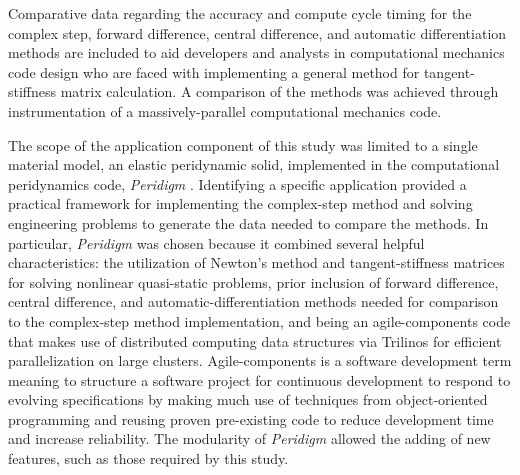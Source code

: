 \documentclass[preprint,12pt]{elsarticle}
\begin{document}
Comparative data regarding the accuracy and compute cycle timing for the complex step, forward difference, central difference, and automatic differentiation methods are included to aid developers and analysts in computational mechanics code design who are faced with implementing a general method for tangent-stiffness matrix calculation.  A comparison of the methods was achieved through instrumentation of a massively-parallel computational mechanics code. 

The scope of the application component of this study was limited to a single material model, an elastic peridynamic solid, implemented in the computational peridynamics code, \textit{Peridigm} \cite{peridigm}. Identifying a specific application provided a practical framework for implementing the   complex-step method and solving engineering problems to generate the data needed to compare the methods. In particular, \emph{Peridigm} was chosen because it combined several helpful characteristics: the utilization of Newton's method and tangent-stiffness matrices for solving nonlinear quasi-static problems, prior inclusion of forward difference, central difference, and automatic-differentiation methods needed for comparison to the complex-step method implementation, and being an agile-components code that makes use of distributed computing data structures via Trilinos \cite{trilinos} for efficient parallelization on large clusters. Agile-components is a software development term meaning to structure a software project for continuous development to respond to evolving specifications by making much use of techniques from object-oriented programming and reusing proven pre-existing code to reduce development time and increase reliability. The modularity of \emph{Peridigm} allowed the adding of new features, such as those required by this study.
\end{document}
